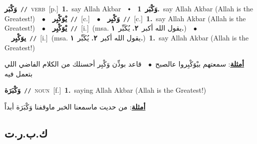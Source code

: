 \documentclass[10pt,a4paper,twoside]{article} %
\begin{document}
\begin{multicols}{2}
{\setlength\topsep{0pt}\textbf{\foreignlanguage{arabic}{وَكْبَر}}\ {\color{gray}\texttt{//}\color{black}}\ \textsc{verb}\ [p.]\ \textbf{1.}~say Allah Akbar\ \ $\smblkdiamond$\ \ \setlength\topsep{0pt}\textbf{\foreignlanguage{arabic}{وَكْبَر}}\ \textbf{1.}~say Allah Akbar (Allah is the Greatest!)\ \ $\bullet$\ \ \setlength\topsep{0pt}\textbf{\foreignlanguage{arabic}{يْوَكْبِر}}\ {\color{gray}\texttt{//}\color{black}}\ [c.]\ \ $\bullet$\ \ \setlength\topsep{0pt}\textbf{\foreignlanguage{arabic}{وَكْبِر}}\ {\color{gray}\texttt{//}\color{black}}\ [c.]\ \textbf{1.}~say Allah Akbar (Allah is the Greatest!)\ \ $\bullet$\ \ \setlength\topsep{0pt}\textbf{\foreignlanguage{arabic}{يْوَكْبِر}}\ {\color{gray}\texttt{//}\color{black}}\ [i.]\ \color{gray}(msa. \foreignlanguage{arabic}{يقول الله أكبر}~\foreignlanguage{arabic}{\textbf{٢.}}  \foreignlanguage{arabic}{يُكَبِّر}~\foreignlanguage{arabic}{\textbf{١.}})\color{black}\ \ $\bullet$\ \ \setlength\topsep{0pt}\textbf{\foreignlanguage{arabic}{يوَكْبِر}}\ {\color{gray}\texttt{//}\color{black}}\ [i.]\ \color{gray}(msa. \foreignlanguage{arabic}{يقول الله أكبر}~\foreignlanguage{arabic}{\textbf{٢.}}  \foreignlanguage{arabic}{يُكَبِّر}~\foreignlanguage{arabic}{\textbf{١.}})\color{black}\ \textbf{1.}~say Allah Akbar (Allah is the Greatest!)\  \begin{flushright}\color{gray}\foreignlanguage{arabic}{\textbf{\underline{\foreignlanguage{arabic}{أمثلة}}}: سمعتهم بيْوَكْبِروا عالصبح\ $\bullet$\ \  قاعد بوذِّن وَكْبِر أحسنلك من الكلام الفاضي اللي بتعمل فيه}\end{flushright}\color{black}} \vspace{2mm}

{\setlength\topsep{0pt}\textbf{\foreignlanguage{arabic}{وَكْبَرَة}}\ {\color{gray}\texttt{//}\color{black}}\ \textsc{noun}\ [f.]\ \textbf{1.}~saying Allah Akbar (Allah is the Greatest!)\  \begin{flushright}\color{gray}\foreignlanguage{arabic}{\textbf{\underline{\foreignlanguage{arabic}{أمثلة}}}: من حديت ماسمعنا الخبر ماوقفنا وَكْبَرَة أبداً}\end{flushright}\color{black}} \vspace{2mm}

\vspace{-3mm}
\subsection*{\color{blue}\foreignlanguage{arabic}{ك.ب.ر.ت}\color{blue}{}} 


\end{multicols}
\end{document}
